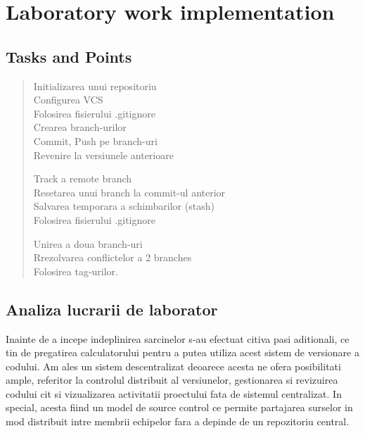\section{Laboratory work implementation}

\subsection{Tasks and Points}

\begin{quote}
\begin{description}

	Initializarea unui repositoriu \\
	Configurea VCS\\
	Folosirea fisierului .gitignore\\
	Crearea branch-urilor\\
	Commit, Push pe branch-uri\\
	Revenire la versiunele anterioare
	
	Track a remote branch\\
	Resetarea unui branch la commit-ul anterior\\
	Salvarea temporara a schimbarilor (stash)\\
	Folosirea fisierului .gitignore
		
	Unirea a doua branch-uri\\
	Rrezolvarea conflictelor a 2 branches\\
	Folosirea tag-urilor.

\end{description}
\end{quote}

\subsection{Analiza lucrarii de laborator}

Inainte de a incepe indeplinirea sarcinelor s-au efectuat citiva pasi aditionali, ce tin de pregatirea calculatorului pentru a putea utiliza acest sistem de versionare a codului. Am ales un sistem descentralizat deoarece acesta ne ofera posibilitati ample, referitor la controlul distribuit al versiunelor, gestionarea si revizuirea codului cit si vizualizarea activitatii proectului fata de sistemul centralizat. In special, acesta fiind un model de source control ce permite partajarea surselor in mod distribuit intre membrii echipelor fara a depinde de un repozitoriu central.

\begin{flushleft} %
\end{flushleft}

